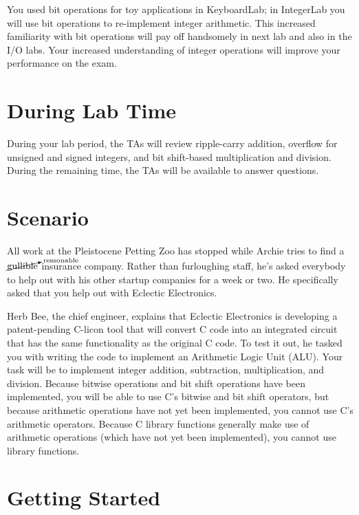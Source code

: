 You used bit operations for toy applications in KeyboardLab; in IntegerLab you
will use bit operations to re-implement integer arithmetic. This increased
familiarity with bit operations will pay off handsomely in next lab and
also in the I/O labs. Your increased understanding of integer operations will
improve your performance on the exam.

\section*{During Lab Time}

During your lab period, the TAs will review ripple-carry addition, overflow for
unsigned and signed integers, and bit shift-based multiplication and division.
During the remaining time, the TAs will be available to answer questions.

\softwareengineeringfrontmatter

\section{Scenario}

All work at the Pleistocene Petting Zoo has stopped while Archie tries to find
a $\cancelto{\mathrm{reasonable}}{\mathrm{gullible}}$ insurance company. Rather
than furloughing staff, he's asked everybody to help out with his other startup
companies for a week or two. He specifically asked that you help out with
Eclectic Electronics.

Herb Bee, the chief engineer, explains that Eclectic Electronics is developing
a patent-pending C-licon tool that will convert C code into an integrated
circuit that has the same functionality as the original C code. To test it out,
he tasked you with writing the code to implement an Arithmetic Logic Unit
(ALU). Your task will be to implement integer addition, subtraction,
multiplication, and division. Because bitwise operations and bit shift
operations have been implemented, you will be able to use C's bitwise and bit
shift operators, but because arithmetic operations have not yet been
implemented, you cannot use C's arithmetic operators. Because C library
functions generally make use of arithmetic operations (which have not yet been
implemented), you cannot use library functions.

\section{Getting Started}

